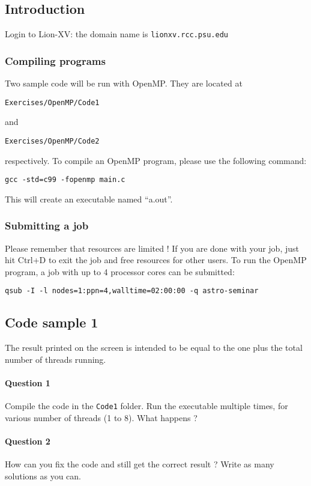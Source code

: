 \documentclass[letterpaper,10pt]{article}
\begin{document}
\subsection{Introduction}
Login to Lion-XV: the domain name is \texttt{lionxv.rcc.psu.edu}

\subsubsection{Compiling programs}
Two sample code will be run with OpenMP. They are located at
\begin{center}
 \texttt{Exercises/OpenMP/Code1}
\end{center}
and
\begin{center}
 \texttt{Exercises/OpenMP/Code2}
\end{center}
respectively.
To compile an OpenMP program, please use the following command:
\begin{center}
 \texttt{gcc -std=c99 -fopenmp main.c}
\end{center}
This will create an executable named ``a.out''.

\subsubsection{Submitting a job}
Please remember that resources are limited ! If you are done with your job, just hit Ctrl+D to exit the job and free resources for other users.
To run the OpenMP program, a job with up to 4 processor cores can be submitted:
\begin{center}
 \texttt{qsub -I -l nodes=1:ppn=4,walltime=02:00:00 -q astro-seminar}
\end{center}


\subsection{Code sample 1}
The result printed on the screen is intended to be equal to the one plus the total number of threads running.
\paragraph{Question 1} Compile the code in the \texttt{Code1} folder. Run the executable multiple times, for various number of threads (1 to 8). What happens ? 
\paragraph{Question 2} How can you fix the code and still get the correct result ? Write as many solutions as you can.  
\end{document}
